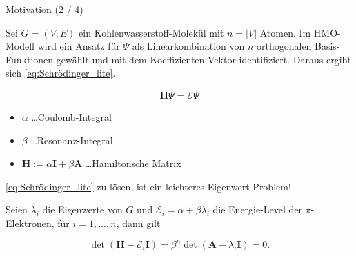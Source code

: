 \documentclass[aspectratio = 169]{beamer}
\begin{document}
\begin{frame}{Motivation (2 / 4)}

    \begin{block}{}

        Sei $G = (V, E)$ ein Kohlenwasserstoff-Molekül mit $n = |V|$ Atomen.
        Im HMO-Modell wird ein Ansatz für $\Psi$ als Linearkombination von $n$ orthogonalen Basis-Funktionen gewählt und mit dem Koeffizienten-Vektor identifiziert.
        Daraus ergibt sich \eqref{eq:Schrödinger_lite}.

        \begin{align} \label{eq:Schrödinger_lite}
            \mathbf H \Psi = \mathcal E \Psi
        \end{align}

        \begin{itemize}
            \item $\alpha$ \dots Coulomb-Integral
            \item $\beta$ \dots Resonanz-Integral
            \item $\mathbf H := \alpha \mathbf I + \beta \mathbf A$ \dots Hamiltonsche Matrix
        \end{itemize}

        \eqref{eq:Schrödinger_lite} zu lösen, ist ein leichteres Eigenwert-Problem!

        Seien $\lambda_i$ die Eigenwerte von $G$ und $\mathcal E_i = \alpha + \beta \lambda_i$ die Energie-Level der $\pi$-Elektronen, für $i = 1, \dots, n$, dann gilt

        \[
            \det(\mathbf H - \mathcal E_i \mathbf I)
            =
            \beta^n \det(\mathbf A - \lambda_i \mathbf I)
            =
            0.
        \]

    \end{block}

\end{frame}

\end{document}
